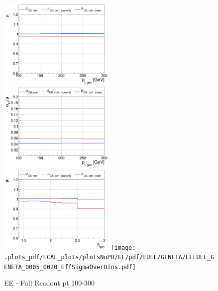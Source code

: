 \begin{figure}
\includegraphics[width=0.495\textwidth]{./plots_pdf/ECAL_plots/plotsNoPU/EE/pdf/FULL/GENPT/EEFULL_GENPT_0100_0300_MuOverBins.pdf}
\includegraphics[width=0.495\textwidth]{./plots_pdf/ECAL_plots/plotsNoPU/EE/pdf/FULL/GENPT/EEFULL_GENPT_0100_0300_EffSigmaOverBins.pdf}
\includegraphics[width=0.495\textwidth]{./plots_pdf/ECAL_plots/plotsNoPU/EE/pdf/FULL/GENETA/EEFULL_GENETA_0100_0300_MuOverBins.pdf}
\texttt{[image: .plots\_pdf/ECAL\_plots/plotsNoPU/EE/pdf/FULL/GENETA/EEFULL\_GENETA\_0005\_0020\_EffSigmaOverBins.pdf]}
\caption{EE - Full Readout pt 100-300}
\end{figure}





